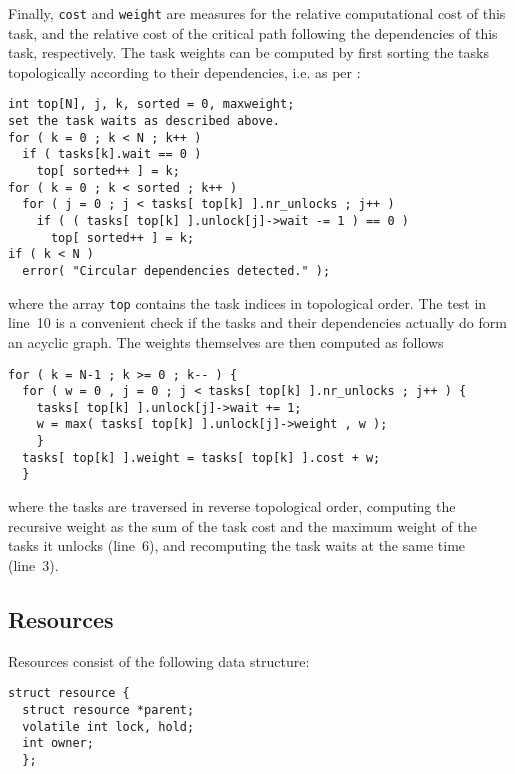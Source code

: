 \documentclass[preprint]{elsarticle}
\begin{document}
Finally, {\tt cost} and {\tt weight} are measures
for the relative computational cost of this task, and the
relative cost of the critical path following the
dependencies of this task, respectively.
The task weights can be computed by first sorting
the tasks topologically according to their dependencies, i.e.
as per \cite{ref:Kahn1962}:
\begin{center}\begin{minipage}{0.9\textwidth}
    \begin{lstlisting}
int top[N], j, k, sorted = 0, maxweight;
set the task waits as described above.
for ( k = 0 ; k < N ; k++ )
  if ( tasks[k].wait == 0 )
    top[ sorted++ ] = k;
for ( k = 0 ; k < sorted ; k++ )
  for ( j = 0 ; j < tasks[ top[k] ].nr_unlocks ; j++ )
    if ( ( tasks[ top[k] ].unlock[j]->wait -= 1 ) == 0 )
      top[ sorted++ ] = k;
if ( k < N )
  error( "Circular dependencies detected." );
    \end{lstlisting}
\end{minipage}\end{center}
\noindent where the array {\tt top} contains the task indices
in topological order. 
The test in line~10 is a convenient check if the tasks and their
dependencies actually do form an acyclic graph.
The weights themselves are then computed as follows
\begin{center}\begin{minipage}{0.9\textwidth}
    \begin{lstlisting}
for ( k = N-1 ; k >= 0 ; k-- ) {
  for ( w = 0 , j = 0 ; j < tasks[ top[k] ].nr_unlocks ; j++ ) {
    tasks[ top[k] ].unlock[j]->wait += 1;
    w = max( tasks[ top[k] ].unlock[j]->weight , w );
    }
  tasks[ top[k] ].weight = tasks[ top[k] ].cost + w;
  }
    \end{lstlisting}
\end{minipage}\end{center}
\noindent where the tasks are traversed in reverse
topological order, computing the recursive weight as the sum of the
task cost and the maximum weight of the tasks it unlocks (line~6),
and recomputing the task waits at the same time (line~3).


\subsection{Resources}

Resources consist of the following data structure:
\begin{center}\begin{minipage}{0.9\textwidth}
    \begin{lstlisting}
struct resource {
  struct resource *parent;
  volatile int lock, hold;
  int owner;
  };
    \end{lstlisting}
\end{minipage}\end{center}
\end{document}
